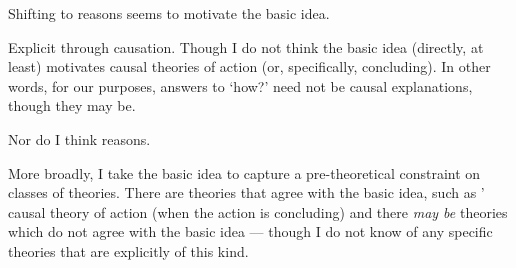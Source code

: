 







\begin{note}
  Shifting to reasons seems to motivate the basic idea.

  Explicit through causation.
  Though I do not think the basic idea (directly, at least) motivates causal theories of action (or, specifically, concluding).
  In other words, for our purposes, answers to `how?' need not be causal explanations, though they may be.

  Nor do I think reasons.

  More broadly, I take the basic idea to capture a pre-theoretical constraint on classes of theories.
  There are theories that agree with the basic idea, such as \citeauthor{Davidson:1963aa}' causal theory of action (when the action is concluding) and there \emph{may be} theories which do not agree with the basic idea --- though I do not know of any specific theories that are explicitly of this kind.
\end{note}

